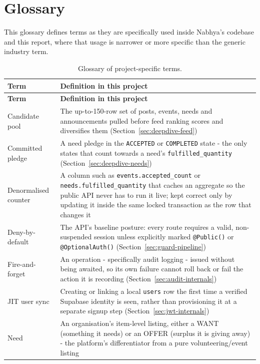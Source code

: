 \chapter{Glossary}
\label{app:glossary}
This glossary defines terms as they are specifically used inside Nabhya's codebase and this report, where that usage is narrower or more specific than the generic industry term.

\begin{longtable}{|p{}|>{\raggedright\arraybackslash}p{}|}
\caption{Glossary of project-specific terms.}\\\hline
\textbf{Term} & \textbf{Definition in this project}\\\hline
\endfirsthead\hline\textbf{Term} & \textbf{Definition in this project}\\\hline\endhead
Candidate pool & The up-to-150-row set of posts, events, needs and announcements pulled before feed ranking scores and diversifies them (Section~\ref{sec:deepdive-feed})\\\hline
Committed pledge & A need pledge in the \texttt{ACCEPTED} or \texttt{COMPLETED} state - the only states that count towards a need's \texttt{fulfilled\_quantity} (Section~\ref{sec:deepdive-needs})\\\hline
Denormalised counter & A column such as \texttt{events.accepted\_count} or \texttt{needs.fulfilled\_quantity} that caches an aggregate so the public API never has to run it live; kept correct only by updating it inside the same locked transaction as the row that changes it\\\hline
Deny-by-default & The API's baseline posture: every route requires a valid, non-suspended session unless explicitly marked \texttt{@Public()} or \texttt{@OptionalAuth()} (Section~\ref{sec:guard-pipeline})\\\hline
Fire-and-forget & An operation - specifically audit logging - issued without being awaited, so its own failure cannot roll back or fail the action it is recording (Section~\ref{sec:audit-internals})\\\hline
JIT user sync & Creating or linking a local \texttt{users} row the first time a verified Supabase identity is seen, rather than provisioning it at a separate signup step (Section~\ref{sec:jwt-internals})\\\hline
Need & An organisation's item-level listing, either a WANT (something it needs) or an OFFER (surplus it is giving away) - the platform's differentiator from a pure volunteering/event listing\\\hline

\end{longtable}
